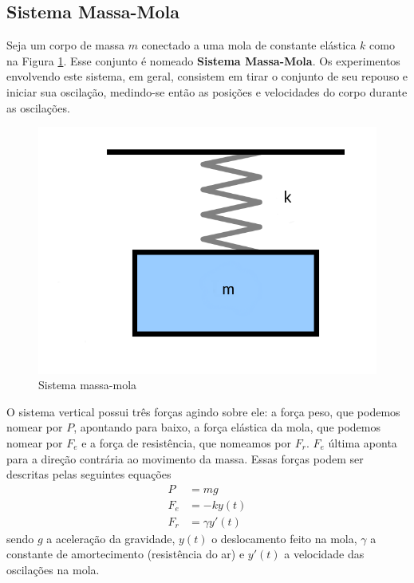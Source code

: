         \subsection{Sistema Massa-Mola}
        
            Seja um corpo de massa $m$ conectado a uma mola de constante elástica $k$ como na Figura \ref{fig:massaMola}. Esse conjunto é nomeado \textbf{Sistema Massa-Mola}.  
            Os experimentos envolvendo este sistema, em geral, consistem em tirar o conjunto de seu repouso e iniciar sua oscilação, medindo-se então as posições e velocidades do corpo durante as oscilações.
            \begin{figure}[H]
                \centering
                \includegraphics[scale=.25]{imagens/Mass_spring.png}
                \caption{Sistema massa-mola}
                \label{fig:massaMola}
            \end{figure}
            
            O sistema vertical possui três forças agindo sobre ele: a força peso, que podemos nomear por $P$, apontando para baixo, a força elástica da mola, que podemos nomear por $F_e$ e a força de resistência, que nomeamos por $F_r$. $F_e$ última aponta para a direção contrária ao movimento da massa. Essas forças podem ser descritas pelas seguintes equações
            \begin{align}
                P &= mg\\
                F_e &= -ky(t)\\
                F_r &= \gamma y'(t)
            \end{align}
            sendo $g$ a aceleração da gravidade, $y(t)$ o deslocamento feito na mola, $\gamma$ a constante de amortecimento (resistência do ar) e $y'(t)$ a velocidade das oscilações na mola.
            
